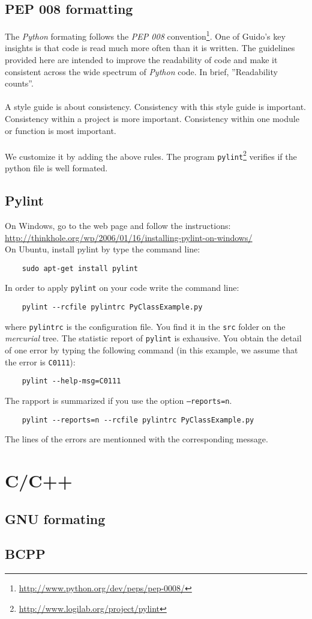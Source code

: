 \documentclass[a4paper, 12pt, oneside]{report}
\begin{document}
\subsection{PEP 008 formatting}
The \textit{Python} formating follows the \textit{PEP 008} convention\footnote{\url{http://www.python.org/dev/peps/pep-0008/}}. One of Guido's key insights is that code is read much more often than it is written. The guidelines provided here are intended to improve the readability of code and make it consistent across the wide spectrum of \textit{Python} code. In brief, ''Readability counts''.\\
\\
A style guide is about consistency. Consistency with this style guide is important. Consistency within a project is more important. Consistency within one module or function is most important.\\
\\
We customize it by adding the above rules. The program \texttt{pylint}\footnote{\url{http://www.logilab.org/project/pylint}} verifies if the python file is well formated.

\subsection{Pylint}
On Windows, go to the web page and follow the instructions:\\
\url{http://thinkhole.org/wp/2006/01/16/installing-pylint-on-windows/}\\
On Ubuntu, install pylint by type the command line:
\begin{verbatim}
	sudo apt-get install pylint
\end{verbatim}
In order to apply \texttt{pylint} on your code write the command line:
\begin{verbatim}
	pylint --rcfile pylintrc PyClassExample.py
\end{verbatim}
where \texttt{pylintrc} is the configuration file. You find it in the \texttt{src} folder on the \textit{mercurial} tree. The statistic report of \texttt{pylint} is exhausive. You obtain the detail of one error by typing the following command (in this example, we assume that the error is \texttt{C0111}):
\begin{verbatim}
	pylint --help-msg=C0111
\end{verbatim}
The rapport is summarized if you use the option \texttt{--reports=n}.
\begin{verbatim}
	pylint --reports=n --rcfile pylintrc PyClassExample.py
\end{verbatim}
The lines of the errors are mentionned with the corresponding message.


\section{C/C++}
\subsection{GNU formating}
\subsection{BCPP}
\end{document}
